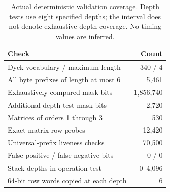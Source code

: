 \begin{table}[t]
\caption{Actual deterministic validation coverage. Depth tests use eight specified depths; the interval does not denote exhaustive depth coverage. No timing values are inferred.}\label{tab:validation}
\small
\begin{tabularx}{\columnwidth}{@{}Xr@{}}\toprule
Check & Count\\\midrule
Dyck vocabulary / maximum length & 340 / 4\\
All byte prefixes of length at most 6 & 5,461\\
Exhaustively compared mask bits & 1,856,740\\
Additional depth-test mask bits & 2,720\\
Matrices of orders 1 through 3 & 530\\
Exact matrix-row probes & 12,420\\
Universal-prefix liveness checks & 70,500\\
False-positive / false-negative bits & 0 / 0\\
Stack depths in operation test & 0--4,096\\
64-bit row words copied at each depth & 6\\
\bottomrule\end{tabularx}
\end{table}

